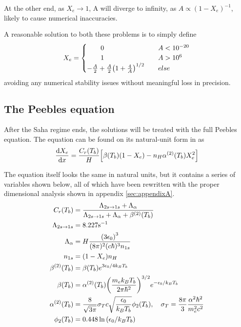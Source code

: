 \documentclass[10pt, a4paper]{article}
\begin{document}
At the other end, as $X_e \rightarrow 1$, A will diverge to infinity, as $A \propto (1 - X_e)^{-1}$, likely to cause numerical inaccuracies.

A reasonable solution \cite{Grandma} to both these problems is to simply define
\begin{equation}\label{eqn:Saha_sol2}
    X_e =
    \begin{cases}
        \quad\quad 0& \quad A < 10^{-20} \\
        \quad\quad 1& \quad A > 10^6 \\
        - \frac{A}{2} + \frac{A}{2}\qty(1 + \frac{4}{A})^{1/2}& \quad else
     \end{cases}    
\end{equation}
avoiding any numerical stability issues without meaningful loss in precision.


\subsection{The Peebles equation}\label{sec:Peebles}
After the Saha regime ends, the solutions will be treated with the full Peebles equation. The equation can be found on its natural-unit form in \cite[p. 71]{ModernCosmology2003} as
\begin{equation}
    \label{eqn:Peebles}
    \dv{X_{e}}{x}=\frac{C_{r}\qty(T_{b})}{H}\qty[\beta\qty(T_{b})\qty(1-X_{e})-n_{H} \alpha^{(2)}\qty(T_{b}) X_{e}^{2}]
\end{equation}

The equation itself looks the same in natural units, but it contains a series of variables shown below, all of which have been rewritten with the proper dimensional analysis shown in appendix \ref{sec:appendixA}.
\begin{align}
    \label{eqn:1x}
    C_{r}\qty(T_{b}) &=\frac{\Lambda_{2 s \rightarrow 1 s}+\Lambda_{\alpha}}{\Lambda_{2 s \rightarrow 1 s}+\Lambda_{\alpha}+\beta^{(2)}\qty(T_{b})} \\
    \label{eqn:2x}
    \Lambda_{2 s \rightarrow 1 s} &=8.227 \mathrm{s}^{-1} \\
    \label{eqn:4x}
    \Lambda_{\alpha} &= H \frac{\qty(3 \epsilon_{0})^{3}}{(8 \pi)^{2} (c\hbar)^3 n_{1 s}} \\
    \label{eqn:5x}
    n_{1 s} &=\qty(1-X_{e}) n_{H} \\
    \label{eqn:6x}
    \beta^{(2)}\qty(T_{b}) &=\beta\qty(T_{b}) e^{3 \epsilon_{0} / 4 k_B T_{b}} \\
    \label{eqn:7x}
    \beta\qty(T_{b}) &= \alpha^{(2)}\qty(T_{b}) \qty(\frac{m_{e} k_B T_{b}}{2 \pi \hbar^2})^{3 / 2} e^{-\epsilon_{0} / k_BT_{b}} \\
    \label{eqn:8x}
    \alpha^{(2)}\qty(T_{b}) &= \frac{8}{\sqrt{3 \pi}} \sigma_T c \sqrt{\frac{\epsilon_{0}}{k_B T_{b}}} \phi_{2}\qty(T_{b}), \quad \sigma_{T}=\frac{8 \pi}{3} \frac{\alpha^{2} \hbar^{2}}{m_{e}^{2} c^{2}} \\
    \label{eqn:9x}
    \phi_{2}\qty(T_{b}) &=0.448 \ln \qty(\epsilon_{0} / k_B T_{b})
\end{align}
\end{document}
